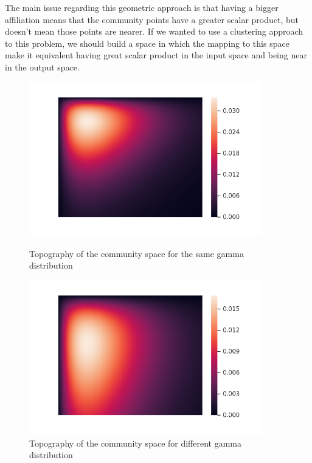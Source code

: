 \documentclass[12pt]{ociamthesis}  %
\begin{document}
	The main issue regarding this geometric approach is that having a bigger affiliation means that the community points have a greater scalar product, but doesn't mean those points are nearer. If we wanted to use a clustering approach to this problem, we should build a space in which the mapping to this space make it equivalent having great scalar product in the input space and being near in the output space.
	\begin{figure}
		\centering
		\begin{minipage}{0.45\textwidth}
			\centering
			\includegraphics[width=0.9\textwidth]{heatMap} %
			\caption{Topography of the community space for the same gamma distribution}
			\label{label-image7}
		\end{minipage}\hfill
		\begin{minipage}{0.45\textwidth}
			\centering
			\includegraphics[width=0.9\textwidth]{heatMapCorrection} %
			\caption{Topography of the community space for different gamma distribution}
			\label{label-image8}
		\end{minipage}
	\end{figure}
\end{document}
